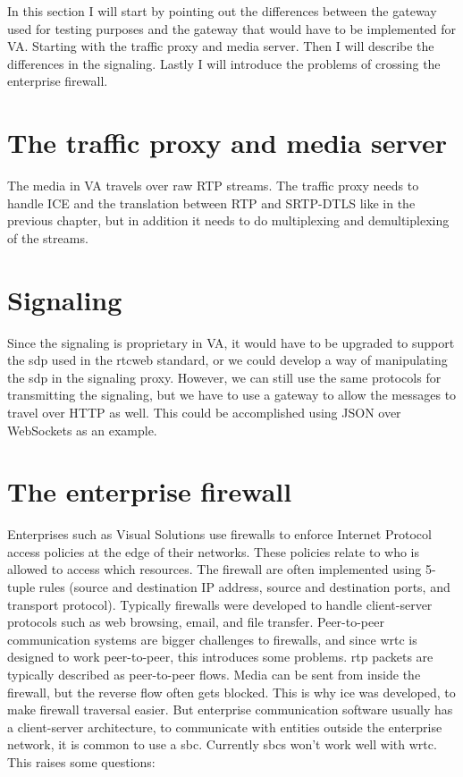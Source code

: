 
In this section I will start by pointing out the differences between the gateway used for testing purposes and the gateway that would have to be implemented for VA. Starting with the traffic proxy and media server. Then I will describe the differences in the signaling. Lastly I will introduce the problems of crossing the enterprise firewall.

\section{The traffic proxy and media server}
The media in VA travels over raw RTP streams. The traffic proxy needs to handle ICE and the translation between RTP and SRTP-DTLS like in the previous chapter, but in addition it needs to do multiplexing and demultiplexing of the streams.

\section{Signaling}
Since the signaling is proprietary in VA, it would have to be upgraded to support the \gls{sdp} used in the \gls{rtcweb} standard, or we could develop a way of manipulating the \gls{sdp} in the signaling proxy. However, we can still use the same protocols for transmitting the signaling, but we have to use a gateway to allow the messages to travel over HTTP as well. This could be accomplished using JSON over WebSockets as an example.

\section{The enterprise firewall}
Enterprises such as Visual Solutions use firewalls to enforce Internet Protocol access policies at the edge of their networks. These policies relate to who is allowed to access which resources. The firewall are often implemented using 5-tuple rules (source and destination IP address, source and destination ports, and transport protocol). Typically firewalls were developed to handle client-server protocols such as web browsing, email, and file transfer\cite{johnston_taking_2013}. Peer-to-peer communication systems are bigger challenges to firewalls, and since \gls{wrtc} is designed to work peer-to-peer, this introduces some problems. \gls{rtp} packets are typically described as peer-to-peer flows. Media can be sent from inside the firewall, but the reverse flow often gets blocked. This is why \gls{ice} was developed, to make firewall traversal easier. But enterprise communication software usually has a client-server architecture, to communicate with entities outside the enterprise network, it is common to use a \gls{sbc}. Currently \gls{sbc}s won't work well with \gls{wrtc}. This raises some questions:

